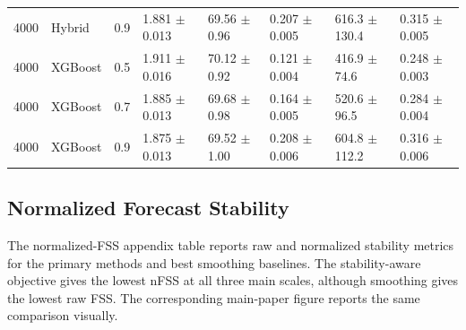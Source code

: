 \documentclass[10pt,conference]{IEEEtran}
\begin{document}
\begin{table}[!t]
{\begin{tabular}{llllllll}
4000 & Hybrid & 0.9 & 1.881 $\pm$ 0.013 & 69.56 $\pm$ 0.96 & 0.207 $\pm$ 0.005 & 616.3 $\pm$ 130.4 & 0.315 $\pm$ 0.005 \\
4000 & XGBoost & 0.5 & 1.911 $\pm$ 0.016 & 70.12 $\pm$ 0.92 & 0.121 $\pm$ 0.004 & 416.9 $\pm$ 74.6 & 0.248 $\pm$ 0.003 \\
4000 & XGBoost & 0.7 & 1.885 $\pm$ 0.013 & 69.68 $\pm$ 0.98 & 0.164 $\pm$ 0.005 & 520.6 $\pm$ 96.5 & 0.284 $\pm$ 0.004 \\
4000 & XGBoost & 0.9 & 1.875 $\pm$ 0.013 & 69.52 $\pm$ 1.00 & 0.208 $\pm$ 0.006 & 604.8 $\pm$ 112.2 & 0.316 $\pm$ 0.006 \\
\bottomrule
\end{tabular}
}
\end{table}

\subsection{Normalized Forecast Stability}
The normalized-FSS appendix table reports raw and normalized stability metrics for the primary methods and best smoothing baselines. The stability-aware objective gives the lowest nFSS at all three main scales, although smoothing gives the lowest raw FSS. The corresponding main-paper figure reports the same comparison visually.
\end{document}
